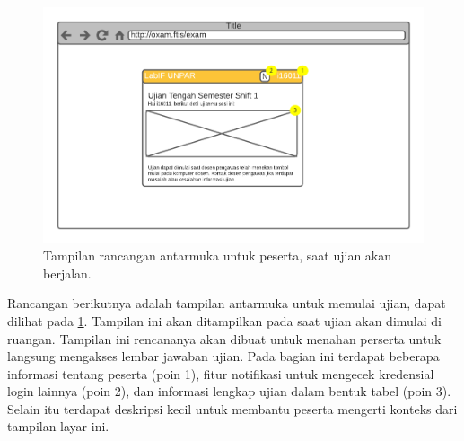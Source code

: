     \begin{figure}[H]
        \centering
        \includegraphics[width=0.7\paperwidth]{Gambar/mockups/Mockup--Peserta - Prestartstate.pdf}
        \caption{Tampilan rancangan antarmuka untuk peserta, saat ujian akan berjalan.}
        \label{fig:mockup_peserta_prestartstate}
    \end{figure}
    Rancangan berikutnya adalah tampilan antarmuka untuk memulai ujian, dapat
    dilihat pada \ref{fig:mockup_peserta_prestartstate}. Tampilan ini akan
    ditampilkan pada saat ujian akan dimulai di ruangan. Tampilan ini rencananya
    akan dibuat untuk menahan perserta untuk langsung mengakses lembar jawaban
    ujian. Pada bagian ini terdapat beberapa informasi tentang peserta (poin 1),
    fitur notifikasi untuk mengecek kredensial login lainnya (poin 2), dan
    informasi lengkap ujian dalam bentuk tabel (poin 3). Selain itu terdapat
    deskripsi kecil untuk membantu peserta mengerti konteks dari tampilan layar
    ini. 
    
